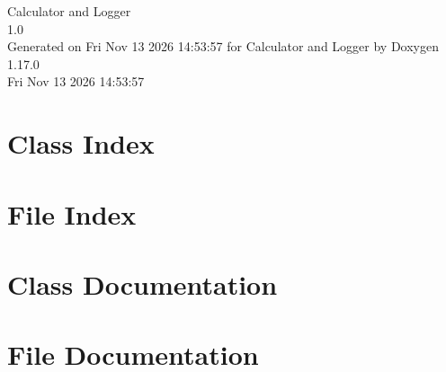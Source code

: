 \documentclass[twoside]{book}
\newcommand{\+}{\discretionary{\mbox{\scriptsize$\hookleftarrow$}}{}{}}
\newcommand{\clearemptydoublepage}{%
    \newpage{\pagestyle{empty}\cleardoublepage}%
  }
\begin{document}
  \raggedbottom
    \hypersetup{pageanchor=false,
                bookmarksnumbered=true,
                pdfencoding=unicode
               }
  \begin{titlepage}
  \vspace*{7cm}
  \begin{center}%
  {\Large Calculator and Logger}\\
  [1ex]\large 1.\+0 \\
  \vspace*{1cm}
  {\large Generated on Fri Nov 13 2026 14:\+53:\+57 for Calculator and Logger by Doxygen 1.17.0}\\
    \vspace*{0.5cm}
    {\small Fri Nov 13 2026 14:53:57}
  \end{center}
  \end{titlepage}
  \clearemptydoublepage
  \tableofcontents
  \clearemptydoublepage
  \hypersetup{pageanchor=true}


\chapter{Class Index}

\chapter{File Index}

\chapter{Class Documentation}


\chapter{File Documentation}





  \backmatter
  \newpage
  \clearemptydoublepage
  \printindex
\end{document}
